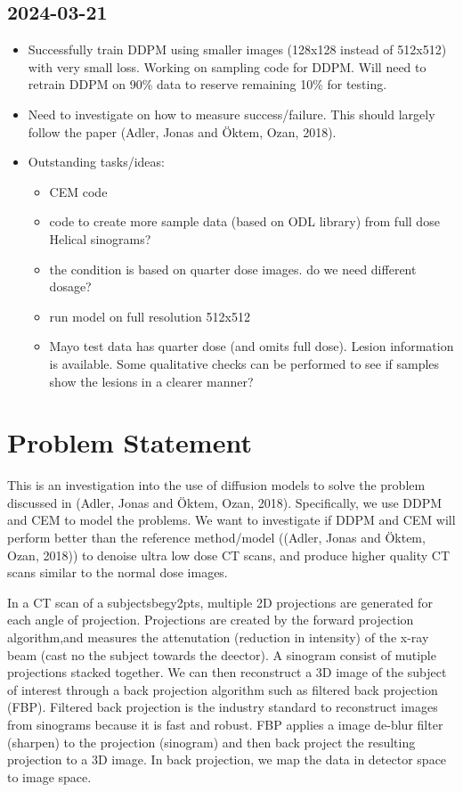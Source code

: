 \documentclass[a4paper, 11pt]{article}
\begin{document}
\subsection{2024-03-21}
\label{sec:org062a791}
\begin{itemize}
\item Successfully train DDPM using smaller images (128x128 instead of 512x512) with very small loss. Working on sampling code for DDPM. Will need to retrain DDPM on 90\% data to reserve remaining 10\% for testing.
\item Need to investigate on how to measure success/failure. This should largely follow the paper (Adler, Jonas and Öktem, Ozan, 2018).
\item Outstanding tasks/ideas:
\begin{itemize}
\item CEM code
\item code to create more sample data (based on ODL library) from full dose Helical sinograms?
\item the condition is based on quarter dose images. do we need different dosage?
\item run model on full resolution 512x512
\item Mayo test data has quarter dose (and omits full dose). Lesion information is available. Some qualitative checks can be performed to see if samples show the lesions in a clearer manner?
\end{itemize}
\end{itemize}
\section{Problem Statement}
\label{sec:org45ae278}
This is an investigation into the use of diffusion models to solve the problem discussed in (Adler, Jonas and Öktem, Ozan, 2018). Specifically, we use DDPM and CEM to model the problems. We want to investigate if DDPM and CEM will perform better than the reference method/model ((Adler, Jonas and Öktem, Ozan, 2018)) to denoise ultra low dose CT scans, and produce higher quality CT scans similar to the normal dose images.

In a CT scan of a subjectsbegy2pts, multiple 2D projections are generated for each angle of projection. Projections are created by the forward projection algorithm,and measures the attenutation (reduction in intensity) of the x-ray beam (cast no the subject towards the deector). A sinogram consist of mutiple projections stacked together. We can then reconstruct a 3D image of the subject of interest through a back projection algorithm such as filtered back projection (FBP). Filtered back projection is the industry standard to reconstruct images from sinograms because it is fast and robust. FBP applies a image de-blur filter (sharpen) to the projection (sinogram) and then back project the resulting projection to a 3D image. In back projection, we map the data in detector space to image space.
\end{document}
